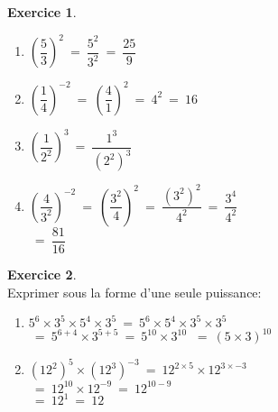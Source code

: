 \documentclass[10pt,a4paper]{article}
\theoremstyle{definition}
\theoremstyle{definition}
\newtheorem{exo}{Exercice}
\begin{document}
\begin{center}
\begin{minipage}[c]{0.4\linewidth}
\begin{exo}
\begin{enumerate}
				\item $\left(\dfrac{5}{3}\right)^2 \ = \ \dfrac{5^2}{3^2} \ = \ \dfrac{25}{9}$
				\item $\left(\dfrac{1}{4}\right)^{-2} \ = \ \left(\dfrac{4}{1}\right)^{2} \ = \ 4^2 \ = \ 16 $
				\item $\left(\dfrac{1}{2^2}\right)^3 \ = \ \dfrac{1^3}{(2^2)^3}$
				\item $\left(\dfrac{4}{3^2}\right)^{-2} \ = \ \left(\dfrac{3^2}{4}\right)^{2} \ = \  \dfrac{(3^2)^2}{4^2} \ = \ \dfrac{3^4}{4^2}$\\[2mm]
				$\ = \ \dfrac{81}{16}$
			\end{enumerate}

	\end{exo}
		\begin{exo}\quad\hfill\textbf{}\\
			Exprimer sous la forme d'une seule puissance: \\
	
				\begin{enumerate}
					
				\item $5^{6}\times3^{5}\times5^{4}\times3^{5} \ = \ 5^{6}\times5^{4}\times3^{5}\times3^{5} $ \\
				$\ = \ 5^{6+4}\times3^{5+5} \ = \ 5^{10}\times3^{10} $ $\ = \ (5\times3)^{10} $\\[5mm]
				
					
				\item $(12^{2})^{5}\times(12^3)^{-3} \ = \ 12^{2\times5}\times12^{3\times-3} $\\$\ = \ 12^{10}\times12^{-9}  \ = \ 12^{10-9} $
				\\ $ \ = \ 12^1 \ = \ 12$
				\end{enumerate} 

			
			
		\end{exo}
	\end{minipage}
\end{center}
\newpage
\quad\\
\end{document}
